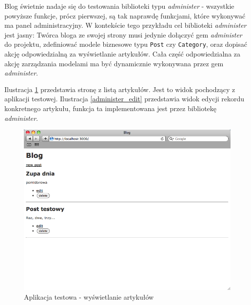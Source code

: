   Blog świetnie nadaje się do testowania biblioteki typu \emph{administer} - wszystkie powyższe funkcje, prócz pierwszej, są tak naprawdę funkcjami, które wykonywać ma panel administracyjny. W kontekście tego przykładu cel biblioteki \emph{administer} jest jasny: Twórca bloga ze swojej strony musi jedynie dołączyć gem \emph{administer} do projektu, zdefiniować modele biznesowe typu \texttt{Post} czy \texttt{Category}, oraz dopisać akcję odpowiedzialną za wyświetlanie artykułów. Cała część odpowiedzialna za akcję zarządzania modelami ma być dynamicznie wykonywana przez gem \emph{administer}. 
  
  Ilustracja \ref{blog_view} przedstawia stronę z listą artykułów. Jest to widok pochodzący z aplikacji testowej. Ilustracja \ref{administer_edit} przedstawia widok edycji rekordu konkretnego artykułu, funkcja ta implementowana jest przez bibliotekę \emph{administer}.
  
  \vspace{5 mm}
  \begin{figure}[!h]
		\begin{center}
			\includegraphics[width=\linewidth]{images/blog.png}
			\caption{Aplikacja testowa - wyświetlanie artykułów}
			\label{blog_view}
		\end{center}
	\end{figure}
	
	\clearpage
	
